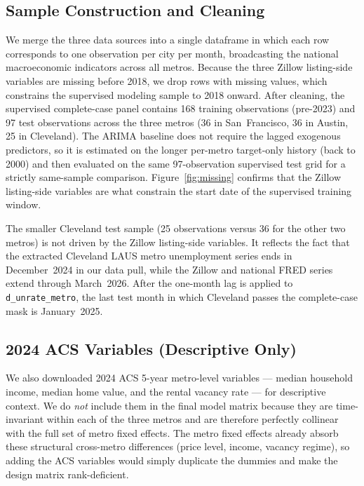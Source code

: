\subsection{Sample Construction and Cleaning}

We merge the three data sources into a single dataframe in which each row corresponds to one observation per city per month, broadcasting the national macroeconomic indicators across all metros. Because the three Zillow listing-side variables are missing before 2018, we drop rows with missing values, which constrains the supervised modeling sample to 2018 onward. After cleaning, the supervised complete-case panel contains 168 training observations (pre-2023) and 97 test observations across the three metros (36 in San~Francisco, 36 in Austin, 25 in Cleveland). The ARIMA baseline does not require the lagged exogenous predictors, so it is estimated on the longer per-metro target-only history (back to 2000) and then evaluated on the same 97-observation supervised test grid for a strictly same-sample comparison. Figure~\ref{fig:missing} confirms that the Zillow listing-side variables are what constrain the start date of the supervised training window.

The smaller Cleveland test sample (25 observations versus 36 for the other two metros) is not driven by the Zillow listing-side variables. It reflects the fact that the extracted Cleveland LAUS metro unemployment series ends in December~2024 in our data pull, while the Zillow and national FRED series extend through March~2026. After the one-month lag is applied to \texttt{d\_unrate\_metro}, the last test month in which Cleveland passes the complete-case mask is January~2025.

\subsection{2024 ACS Variables (Descriptive Only)}

We also downloaded 2024 ACS 5-year metro-level variables --- median household income, median home value, and the rental vacancy rate --- for descriptive context. We do \emph{not} include them in the final model matrix because they are time-invariant within each of the three metros and are therefore perfectly collinear with the full set of metro fixed effects. The metro fixed effects already absorb these structural cross-metro differences (price level, income, vacancy regime), so adding the ACS variables would simply duplicate the dummies and make the design matrix rank-deficient.


